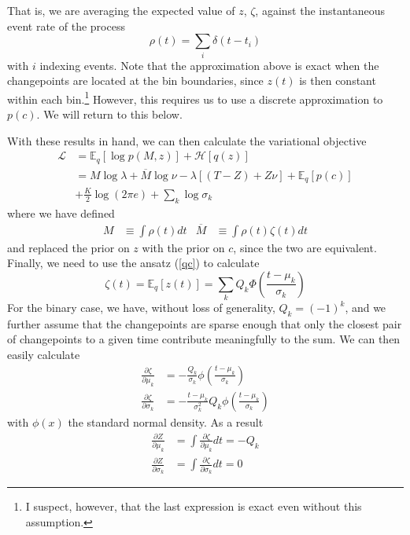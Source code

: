 \documentclass[11pt]{article}
\begin{document}
That is, we are averaging the expected value of $z$, $\zeta$, against the instantaneous event rate of the process
\begin{equation}
    \rho(t) = \sum_i \delta(t - t_i)
\end{equation}
with $i$ indexing events. Note that the approximation above is exact when the changepoints are located at the bin boundaries, since $z(t)$ is then constant within each bin.\footnote{I suspect, however, that the last expression is exact even without this assumption.} However, this requires us to use a discrete approximation to $p(c)$. We will return to this below.

With these results in hand, we can then calculate the variational objective
\begin{align}
    \mathcal{L} &= \mathbb{E}_q [\log p(M, z)] + \mathcal{H}[q(z)] \\
    &= M \log \lambda + \overline{M} \log \nu - \lambda [(T - Z) + Z\nu] + \mathbb{E}_q[p(c)] \\
    &+ \frac{K}{2}\log(2\pi e) + \sum_k \log \sigma_k
\end{align}
where we have defined
\begin{align}
    M &\equiv \int \rho(t) dt &
    \overline{M} &\equiv \int \rho(t) \zeta(t) dt
\end{align}
and replaced the prior on $z$ with the prior on $c$, since the two are equivalent. Finally, we need to use the ansatz (\ref{qc}) to calculate
\begin{equation}
    \zeta(t) = \mathbb{E}_q[z(t)] = \sum_k Q_k \Phi\left(\frac{t - \mu_k}{\sigma_k} \right)
\end{equation}
For the binary case, we have, without loss of generality, $Q_k = (-1)^k$, and we further assume that the changepoints are sparse enough that only the closest pair of changepoints to a given time contribute meaningfully to the sum. We can then easily calculate
\begin{align}
    \frac{\partial \zeta}{\partial \mu_k} &= -\frac{Q_k}{\sigma_k}\phi\left( \frac{t - \mu_k}{\sigma_k}\right) \\
    \frac{\partial \zeta}{\partial \sigma_k} &= -\frac{t - \mu_k}{\sigma_k^2} Q_k\phi\left( \frac{t - \mu_k}{\sigma_k}\right)
\end{align}
with $\phi(x)$ the standard normal density. As a result
\begin{align}
    \frac{\partial Z}{\partial \mu_k} &= \int \frac{\partial \zeta}{\partial \mu_k} dt = -Q_k \\
    \frac{\partial Z}{\partial \sigma_k} &= \int \frac{\partial \zeta}{\partial \sigma_k} dt = 0
\end{align}
\end{document}
